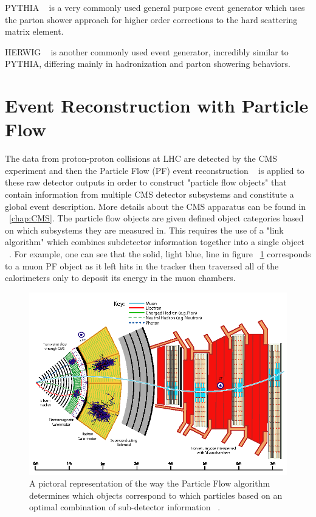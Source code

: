 PYTHIA ~\cite{Sjostrand:2006za} is a very commonly used general purpose event generator which uses the parton shower approach for higher order corrections to the hard scattering matrix element.

HERWIG  ~\cite{herwigpp} is another commonly used event generator, incredibly similar to PYTHIA, differing mainly in hadronization and parton showering behaviors.


\section{Event Reconstruction with Particle Flow}\label{sec:PFReco}


The data from proton-proton collisions at LHC are detected by the CMS experiment and then the Particle Flow (PF) event reconstruction ~\cite{Sirunyan:2017ulk} is applied to these raw detector outputs in order to construct "particle flow objects" that contain information from multiple CMS detector subsystems and constitute a global event description. More details about the CMS apparatus can be found in ~\ref{chap:CMS}. The particle flow objects are given defined object categories based on which subsystems they are measured in. This requires the use of a "link algorithm" which combines subdetector information together into a single object ~\cite{Sirunyan:2017ulk}. For example, one can see that the solid, light blue, line in figure ~\ref{fig:cmsPF} corresponds to a muon PF object as it left hits in the tracker then traversed all of the calorimeters only to deposit its energy in the muon chambers.


\begin{figure}[htb]
\centering
\includegraphics[width=1.0\textwidth]{Chapter-1/cmsPflow.png}
\caption{A pictoral representation of the way the Particle Flow algorithm determines which objects correspond to which particles based on an optimal combination of sub-detector information ~\cite{Sirunyan:2017ulk}.}
\label{fig:cmsPF}
\end{figure}



